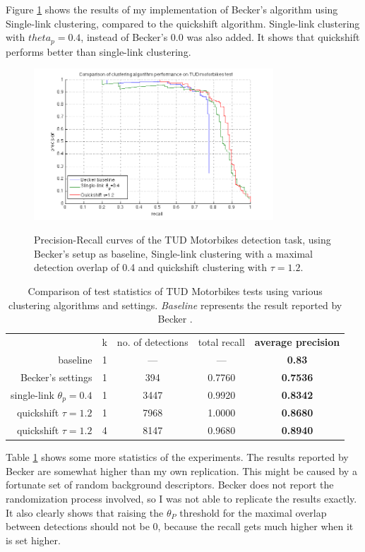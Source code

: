 Figure \ref{fig:tudk1clusteralgos} shows the results of my implementation of Becker's algorithm using Single-link clustering, compared to the quickshift algorithm. Single-link clustering with $theta_p = 0.4$, instead of Becker's $0.0$ was also added. It shows that quickshift performs better than single-link clustering.

\begin{figure}[hbt]
    \centering
    \includegraphics[width=0.8\textwidth]{TUD_k1_clusteralgs}
    \label{fig:tudk1clusteralgos}
    \caption{Precision-Recall curves of the TUD Motorbikes detection task, using Becker's \cite{becker2012codebook} setup as baseline, Single-link clustering with a maximal detection overlap of 0.4 and quickshift clustering with $\tau = 1.2$.}
\end{figure}

\begin{table}
    \begin{tabular}{rc|cc>{\bfseries}c}
        ~&k&no. of detections&total recall&average precision \\
        baseline&1&---&---&0.83 \\
        Becker's settings&1&394&0.7760&0.7536\\
        single-link $\theta_p=0.4$&1&3447&0.9920&0.8342\\
        quickshift $\tau=1.2$&1&7968&1.0000&0.8680\\
        quickshift $\tau=1.2$&4&8147&0.9680&0.8940
    \end{tabular}
    \label{tab:tudk1clusteralgos}
    \caption{Comparison of test statistics of TUD Motorbikes tests using various clustering algorithms and settings. \emph{Baseline} represents the result reported by Becker \cite{becker2012codebook}.}
\end{table}

Table \ref{tab:tudk1clusteralgos} shows some more statistics of the experiments. The results reported by Becker are somewhat higher than my own replication. This might be caused by a fortunate set of random background descriptors. Becker does not report the randomization process involved, so I was not able to replicate the results exactly. It also clearly shows that raising the $\theta_P$ threshold for the maximal overlap between detections should not be 0, because the recall gets much higher when it is set higher.



